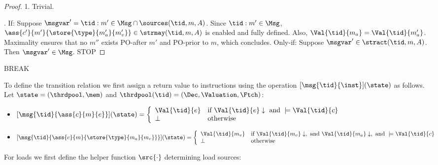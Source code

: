\begin{proof}
1. Trivial.

. If: Suppose $\msgvar' = \tid:m'\in\Msg\cap\sources(\tid,m,A)$.
Since $\tid:m'\in\Msg$, $\ass{c'}{m'}{\store{\type}{m_a'}{m_v'}}\in\strmay(\tid,m,A)$ is enabled and fully
defined. Also, $\Val{\tid}{m_a}=\Val{\tid}{m_a'}$. Maximality ensures that no $m''$ exists PO-after
$m'$ and PO-prior to $m$, which concludes.
Only-if: Suppose $\msgvar'\in\stract(\tid,m,A)$. Then $\msgvar'\in\Msg$.
STOP


\end{proof}


BREAK



To define the transition relation we first assign a return value to instructions using the operation $[\msg{\tid}{\inst}](\state)$ as follows.
Let $\state=(\thrdpool,\mem)$ and $\thrdpool(\tid)=(\Dec,\Valuation,\Ftch)$:
%
\begin{itemize}
\item $[\msg{\tid}{\ass{c}{m}{e}}](\state) =
\left \{
  \begin{array}{ll}
     \Val{\tid}{e} & \mbox{if }\Val{\tid}{e}\downarrow\mbox{ and }\models\Val{\tid}{c} \\
     \perp & \mbox{otherwise}
   \end{array}
 \right.
$
\item $[\msg{\tid}{\ass{c}{m}{\store{\type}{m_a}{m_v}}}](\state) = 
    \left \{
      \begin{array}{ll}
        \Val{\tid}{m_v} &  \mbox{if } \Val{\tid}{m_v}\downarrow, \mbox{ and } \Val{\tid}{m_a}\downarrow, \mbox{ and }
                     \models\Val{\tid}{c} \\
        \perp & \mbox{otherwise}
      \end{array}
    \right .
$
\end{itemize}
%
For loads we first define the helper function $\src{\cdot}$ determining load sources:
%
